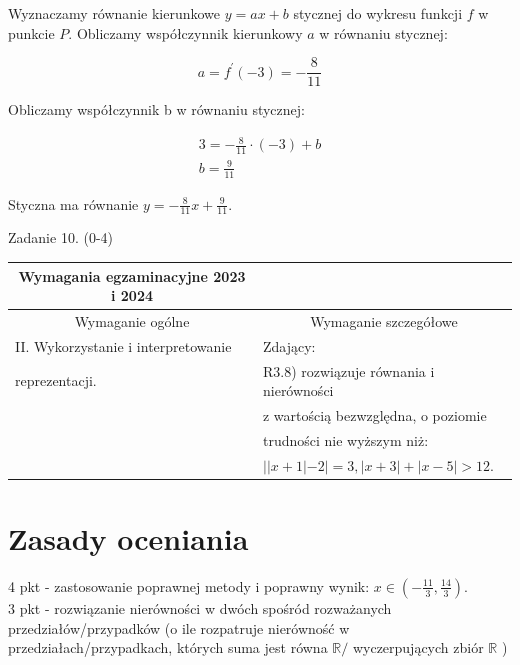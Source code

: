 \documentclass[10pt]{article}
\begin{document}
Wyznaczamy równanie kierunkowe $y=a x+b$ stycznej do wykresu funkcji $f$ w punkcie $P$. Obliczamy współczynnik kierunkowy $a$ w równaniu stycznej:

$$
a=f^{\prime}(-3)=-\frac{8}{11}
$$

Obliczamy współczynnik b w równaniu stycznej:

$$
\begin{gathered}
3=-\frac{8}{11} \cdot(-3)+b \\
b=\frac{9}{11}
\end{gathered}
$$

Styczna ma równanie $y=-\frac{8}{11} x+\frac{9}{11}$.

Zadanie 10. (0-4)

\begin{center}
\begin{tabular}{|l|l|}
\hline
\multicolumn{1}{|c|}{Wymagania egzaminacyjne 2023 i 2024} &  \\
\hline
\multicolumn{1}{|c|}{Wymaganie ogólne} & \multicolumn{1}{c|}{Wymaganie szczegółowe} \\
\hline
II. Wykorzystanie i interpretowanie & Zdający: \\
reprezentacji. & R3.8) rozwiązuje równania i nierówności \\
 & z wartością bezwzględna, o poziomie \\
 & trudności nie wyższym niż: \\
 & $||x+1|-2|=3,|x+3|+|x-5|>12$. \\
\hline
\end{tabular}
\end{center}

\section*{Zasady oceniania}
4 pkt - zastosowanie poprawnej metody i poprawny wynik: $x \in\left(-\frac{11}{3}, \frac{14}{3}\right)$.\\
3 pkt - rozwiązanie nierówności w dwóch spośród rozważanych przedziałów/przypadków (o ile rozpatruje nierówność w przedziałach/przypadkach, których suma jest równa $\mathbb{R} /$ wyczerpujących zbiór $\mathbb{R}$ )
\end{document}
